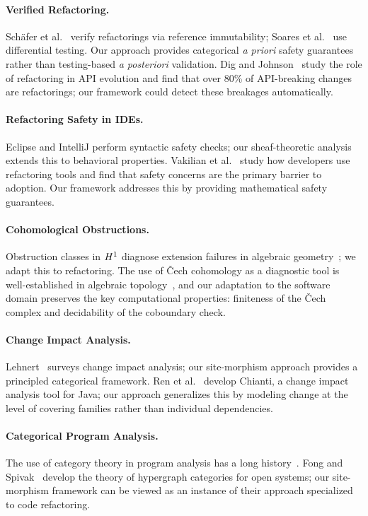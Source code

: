 \documentclass[11pt]{article}
\begin{document}
\paragraph{Verified Refactoring.}
Schäfer et al.~\cite{Schafer2010} verify refactorings via reference
immutability; Soares et al.~\cite{Soares2013} use differential testing.
Our approach provides categorical \emph{a priori} safety guarantees
rather than testing-based \emph{a posteriori} validation.
Dig and Johnson~\cite{Dig2006} study the role of refactoring in API
evolution and find that over 80\% of API-breaking changes are
refactorings; our framework could detect these breakages automatically.

\paragraph{Refactoring Safety in IDEs.}
Eclipse and IntelliJ perform syntactic safety checks; our sheaf-theoretic
analysis extends this to behavioral properties.
Vakilian et al.~\cite{Vakilian2012} study how developers use refactoring
tools and find that safety concerns are the primary barrier to adoption.
Our framework addresses this by providing mathematical safety guarantees.

\paragraph{Cohomological Obstructions.}
Obstruction classes in $H^{1}$ diagnose extension failures in
algebraic geometry~\cite{Hartshorne1977}; we adapt this to refactoring.
The use of Čech cohomology as a diagnostic tool is well-established
in algebraic topology~\cite{BottTu1982}, and our adaptation to the
software domain preserves the key computational properties: finiteness
of the Čech complex and decidability of the coboundary check.

\paragraph{Change Impact Analysis.}
Lehnert~\cite{Lehnert2011} surveys change impact analysis; our
site-morphism approach provides a principled categorical framework.
Ren et al.~\cite{Ren2004} develop Chianti, a change impact analysis
tool for Java; our approach generalizes this by modeling change at the
level of covering families rather than individual dependencies.

\paragraph{Categorical Program Analysis.}
The use of category theory in program analysis has a long
history~\cite{Moggi1991,Wadler1992}.  Fong and Spivak~\cite{Fong2019}
develop the theory of hypergraph categories for open systems; our
site-morphism framework can be viewed as an instance of their approach
specialized to code refactoring.
\end{document}
